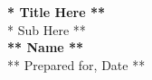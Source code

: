 \begin{titlepage}
    \begin{center}
    {\fontsize{40}{48}\selectfont \bfseries ** Title Here **} 
    \\\vspace{20pt}
    {\LARGE ** Sub Here **} \\
    \vspace{20pt}
    \textbf{** Name **}
    \vspace{8pt}
    \\ ** Prepared for, Date **
    \end{center}
\end{titlepage}
